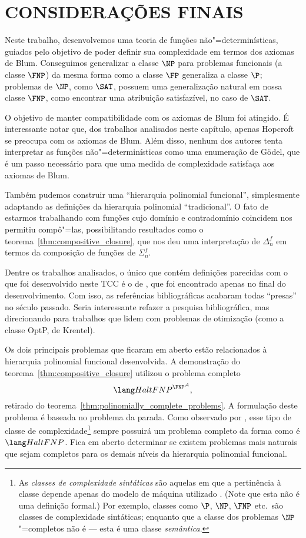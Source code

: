\section{CONSIDERAÇÕES FINAIS}

Neste trabalho,
desenvolvemos uma teoria de funções não"=determinísticas,
guiados pelo objetivo de poder definir sua complexidade
em termos dos axiomas de Blum.
Conseguimos generalizar a classe $\NP$ para problemas funcionais
(a classe $\FNP$)
da mesma forma como a classe $\FP$ generaliza a classe $\P$;
problemas de $\NP$,
como $\SAT$,
possuem uma generalização natural em nossa classe $\FNP$,
como encontrar uma atribuição satisfazível, no caso de $\SAT$.

O objetivo de manter compatibilidade com os axiomas de Blum foi atingido.
É interessante notar que, dos trabalhos analisados neste capítulo,
apenas Hopcroft se preocupa com os axiomas de Blum.
Além disso,
nenhum dos autores tenta interpretar as funções não"=determinísticas
como uma enumeração de Gödel,
que é um passo necessário para que uma medida de complexidade
satisfaça aos axiomas de Blum.

Também pudemos construir uma ``hierarquia polinomial funcional'',
simplesmente adaptando as definições da hierarquia polinomial ``tradicional''.
O fato de estarmos trabalhando com funções
cujo domínio e contradomínio coincidem
nos permitiu compô"=las,
possibilitando resultados como o teorema~\ref{thm:compositive_closure},
que nos deu uma interpretação de $\Delta_n^f$
em termos da composição de funções de $\Sigma_n^f$.

Dentre os trabalhos analisados,
o único que contém definições parecidas com o que foi desenvolvido neste TCC
é o de \cite[p.~3]{Krentel1988},
que foi encontrado apenas no final do desenvolvimento.
Com isso,
as referências bibliográficas acabaram todas ``presas''
no século passado.
Seria interessante refazer a pesquisa bibliográfica,
mas direcionando para trabalhos que lidem com problemas de otimização
(como a classe OptP, de Krentel).

Os dois principais problemas que ficaram em aberto
estão relacionados à hierarquia polinomial funcional desenvolvida.
A demonstração do teorema~\ref{thm:compositive_closure}
utilizou o problema completo
\begin{equation*}
    \HaltFNP^{\FNP^\mathcal A},
\end{equation*}
retirado do teorema~\ref{thm:polinomially_complete_problems}.
A formulação deste problema é baseada no problema da parada.
Como observado por ,
esse tipo de classe de complexidade\footnote{
    As \emph{classes de complexidade sintáticas}
    são aquelas em que a pertinência à classe
    depende apenas do modelo de máquina utilizado
    \cite[p.~255]{Papadimitriou1994}.
    (Note que esta não é uma definição formal.)
    Por exemplo,
    classes como $\P$, $\NP$, $\FNP$ etc.\ são classes de complexidade sintáticas;
    enquanto que a classe dos problemas $\NP$"=completos não é
    --- esta é uma classe \emph{semântica}.
}
sempre possuirá um problema completo da forma como é $\HaltFNP$.
Fica em aberto determinar se existem problemas mais naturais
que sejam completos para os demais níveis da hierarquia polinomial funcional.


